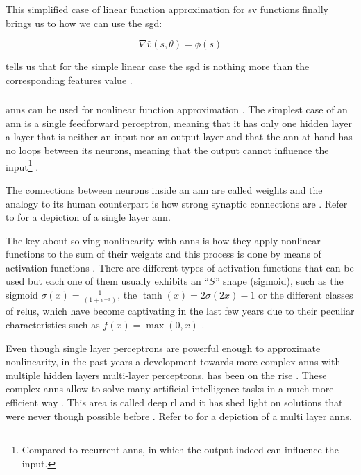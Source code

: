 This simplified case of linear function approximation for \gls{sv} functions finally brings us to how we can use the \gls{sgd}:

\begin{equation}
\label{eq:sgd_linear}
	\nabla \hat{v} (s,\theta) = \phi (s)
\end{equation}

 tells us that for the simple linear case the \gls{sgd} is nothing more than the corresponding features value  \citep[p. 199]{Sutton2017}.

\subsubsection{}
\label{subsubsec:ann_theory}

\glspl{ann} can be used for nonlinear function approximation \citep[p. 199]{Sutton2017}. The simplest case of an \gls{ann} is a single feedforward perceptron, meaning that it has only one hidden layer \ie a layer that is neither an input nor an output layer and that the \gls{ann} at hand has no loops between its neurons, meaning that the output cannot influence the input\footnote{Compared to recurrent \glspl{ann}, in which the output indeed can influence the input.} \citep[p. 216]{Sutton2017}. 

The connections between neurons inside an \gls{ann} are called weights and the analogy to its human counterpart is how strong synaptic connections are \citep[p. 216]{Sutton2017}. Refer to  for a depiction of a single layer \gls{ann}.

The key about solving nonlinearity with \glspl{ann} is how they apply nonlinear functions to the sum of their weights and this process is done by means of activation functions \citep[p. 216]{Sutton2017}. There are different types of activation functions that can be used but each one of them usually exhibits an ``$S$'' shape (\ie sigmoid), such as the sigmoid $\sigma(x) = \frac{1}{(1+e^{-x})}$, the $\tanh(x) = 2\sigma(2x)-1$ or the different classes of \glspl{relu}, which have become captivating in the last few years due to their peculiar characteristics such as $f(x) = \max(0,x)$ \citep[p. 216]{Sutton2017}.

Even though single layer perceptrons are powerful enough to approximate nonlinearity, in the past years a development towards more complex \glspl{ann} with multiple hidden layers \ie multi-layer perceptrons, has been on the rise \citep[p. 217]{Sutton2017}. These complex \glspl{ann} allow to solve many artificial intelligence tasks in a much more efficient way \citep{Bengio2009}. This area is called deep \gls{rl} and it has shed light on solutions that were never though possible before \citep{Bengio2009}. Refer to  for a depiction of a multi layer \glspl{ann}.


